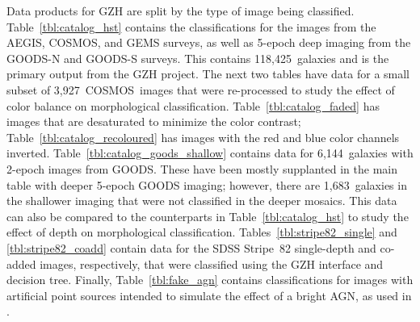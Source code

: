 \documentclass[twocolumn]{aastex6}
\begin{document}
Data products for GZH are split by the type of image being classified. Table~\ref{tbl:catalog_hst} contains the classifications for the \hst{} images from the AEGIS, COSMOS, and GEMS surveys, as well as 5-epoch deep imaging from the GOODS-N and GOODS-S surveys. This contains 118,425~galaxies and is the primary output from the GZH project. The next two tables have data for a small subset of 3,927~COSMOS~images that were re-processed to study the effect of color balance on morphological classification. Table~\ref{tbl:catalog_faded} has images that are desaturated to minimize the color contrast; Table~\ref{tbl:catalog_recoloured} has images with the red and blue color channels inverted. Table~\ref{tbl:catalog_goods_shallow} contains data for 6,144~galaxies with 2-epoch images from GOODS. These have been mostly supplanted in the main table with deeper 5-epoch GOODS imaging; however, there are 1,683~galaxies in the shallower imaging that were not classified in the deeper mosaics. This data can also be compared to the counterparts in Table~\ref{tbl:catalog_hst} to study the effect of depth on morphological classification. Tables~\ref{tbl:stripe82_single} and \ref{tbl:stripe82_coadd} contain data for the SDSS Stripe~82 single-depth and co-added images, respectively, that were classified using the GZH interface and decision tree. Finally, Table~\ref{tbl:fake_agn} contains classifications for images with artificial point sources intended to simulate the effect of a bright AGN, as used in \citet{sim14}.  
\end{document}
